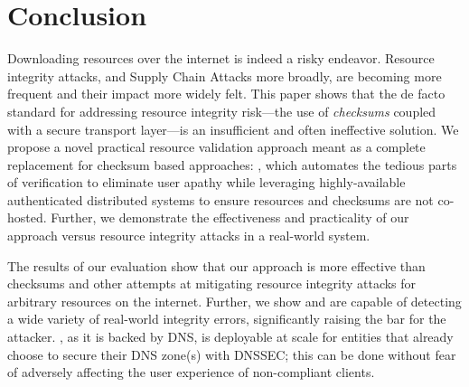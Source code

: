 \section{Conclusion} \label{sec:conclusion}

Downloading resources over the internet is indeed a risky endeavor. Resource
integrity attacks, and Supply Chain Attacks more broadly, are becoming more
frequent and their impact more widely felt. This paper shows that the de facto
standard for addressing resource integrity risk---the use of \emph{checksums}
coupled with a secure transport layer---is an insufficient and often ineffective
solution. We propose a novel practical resource validation approach meant as a
complete replacement for checksum based approaches: \SYSTEM{}, which automates
the tedious parts of verification to eliminate user apathy while leveraging
highly-available authenticated distributed systems to ensure resources and
checksums are not co-hosted. Further, we demonstrate the effectiveness and
practicality of our approach versus resource integrity attacks in a real-world
system.

The results of our evaluation show that our approach is more effective than
checksums and other attempts at mitigating resource integrity attacks for
arbitrary resources on the internet. Further, we show \DNSSYS{} and \DHTSYS{}
are capable of detecting a wide variety of real-world integrity errors,
significantly raising the bar for the attacker. \DNSSYS{}, as it is backed by
DNS, is deployable at scale for entities that already choose to secure their DNS
zone(s) with DNSSEC; this can be done without fear of adversely affecting the
user experience of non-compliant clients.
